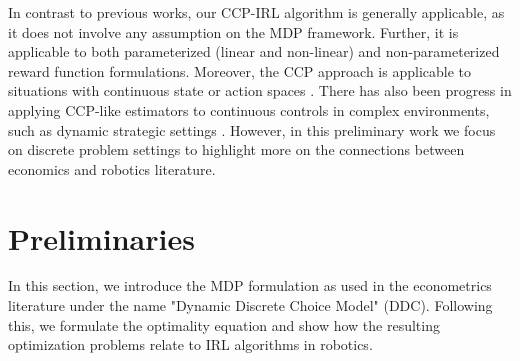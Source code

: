 \documentclass{article}
\begin{document}


In contrast to previous works, our CCP-IRL algorithm is generally applicable, as it does not involve any assumption on the MDP framework. 
Further, it is applicable to both parameterized (linear and non-linear) and non-parameterized reward function formulations. Moreover, the CCP approach is applicable to situations with continuous state or action spaces \cite{altuug1998effect}. There has also been progress in applying CCP-like estimators to continuous controls in complex environments, such as dynamic strategic settings \cite{pesendorfer}. However, in this preliminary work we focus on discrete problem settings to highlight more on the connections between economics and robotics literature.


\section{Preliminaries}

In this section, we introduce the MDP formulation as used in the econometrics literature under the name "Dynamic Discrete Choice Model" (DDC). Following this, we formulate the optimality equation and show how the resulting optimization problems relate to IRL algorithms in robotics.
\end{document}
